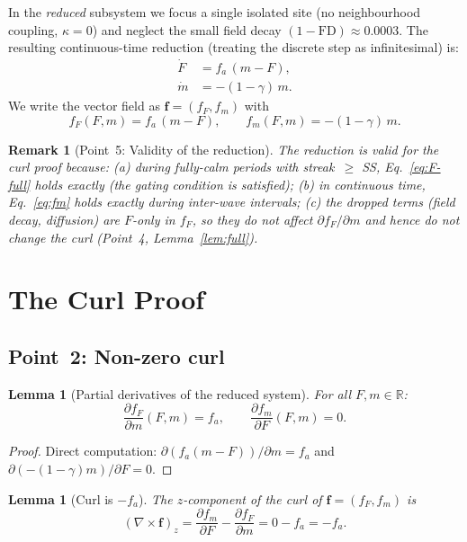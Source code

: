 \documentclass[11pt,a4paper]{article}
\newtheorem{lemma}[theorem]{Lemma}
\newtheorem{remark}[theorem]{Remark}
\begin{document}
In the \emph{reduced} subsystem we focus a single isolated site
(no neighbourhood coupling, $\kappa=0$) and neglect the small field
decay $(1-\mathrm{FD})\approx 0.0003$.
The resulting continuous-time reduction (treating the discrete step as
infinitesimal) is:
\begin{align}
  \dot{F} &= f_a\,(m - F), \label{eq:fF}\\
  \dot{m} &= -(1-\gamma)\,m. \label{eq:fm}
\end{align}
We write the vector field as $\mathbf{f}=(f_F, f_m)$ with
\[
  f_F(F,m) = f_a\,(m-F), \qquad
  f_m(F,m) = -(1-\gamma)\,m.
\]

\begin{remark}[Point~5: Validity of the reduction]
The reduction is valid for the curl proof because:
(a) during fully-calm periods with streak~$\geq$ SS, Eq.~\eqref{eq:F-full}
    holds exactly (the gating condition is satisfied);
(b) in continuous time, Eq.~\eqref{eq:fm} holds exactly during inter-wave
    intervals;
(c) the dropped terms (field decay, diffusion) are $F$-only in $f_F$,
    so they do not affect $\partial f_F/\partial m$ and hence do not
    change the curl (Point~4, Lemma~\ref{lem:full}).
\end{remark}

\section{The Curl Proof}
\label{sec:proof}

\subsection{Point~2: Non-zero curl}

\begin{lemma}[Partial derivatives of the reduced system]
\label{lem:partials}
For all $F, m \in \mathbb{R}$:
\[
  \frac{\partial f_F}{\partial m}(F,m) = f_a, \qquad
  \frac{\partial f_m}{\partial F}(F,m) = 0.
\]
\end{lemma}
\begin{proof}
Direct computation:
$\partial(f_a(m-F))/\partial m = f_a$ and
$\partial(-(1-\gamma)m)/\partial F = 0$.
\end{proof}

\begin{lemma}[Curl is $-f_a$]
\label{lem:curl}
The $z$-component of the curl of $\mathbf{f}=(f_F, f_m)$ is
\[
  (\nabla\times\mathbf{f})_z
  = \frac{\partial f_m}{\partial F} - \frac{\partial f_F}{\partial m}
  = 0 - f_a = -f_a.
\]
\end{lemma}
\end{document}
